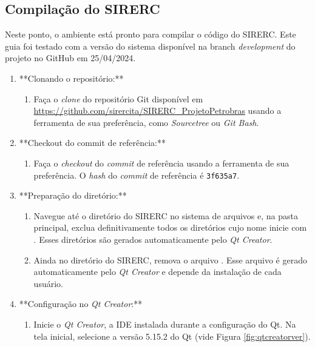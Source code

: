 \documentclass[a4paper,11pt]{article}
\newcommand{\sistema}{\textsf{SIRERC}}
\newcommand{\qtcreator}{\textit{Qt Creator}}
\begin{document}
\subsection{Compilação do \sistema{}}

Neste ponto, o ambiente está pronto para compilar o código do \sistema{}. Este guia foi testado com a versão do sistema disponível na branch \emph{development} do projeto no GitHub em 25/04/2024.

\begin{enumerate}
	\item **Clonando o repositório:**
	\begin{enumerate}
		\item Faça o \emph{clone} do repositório Git disponível em \url{https://github.com/sirercita/SIRERC_ProjetoPetrobras} usando a ferramenta de sua preferência, como \textit{Sourcetree} ou \textit{Git Bash}.
	\end{enumerate}
	
	\item **Checkout do commit de referência:**
	\begin{enumerate}
		\item Faça o \emph{checkout} do \emph{commit} de referência usando a ferramenta de sua preferência. O \emph{hash} do \emph{commit} de referência é \texttt{3f635a7}.
	\end{enumerate}
	
	\item **Preparação do diretório:**
	\begin{enumerate}
		\item Navegue até o diretório do \sistema{} no sistema de arquivos e, na pasta principal, exclua definitivamente todos os diretórios cujo nome inicie com . Esses diretórios são gerados automaticamente pelo \qtcreator{}.
		\item Ainda no diretório do \sistema{}, remova o arquivo . Esse arquivo é gerado automaticamente pelo \qtcreator{} e depende da instalação de cada usuário.
	\end{enumerate}
	
	\item **Configuração no \qtcreator{}:**
	\begin{enumerate}
		\item Inicie o \qtcreator{}, a IDE instalada durante a configuração do Qt. Na tela inicial, selecione a versão 5.15.2 do Qt (vide Figura \ref{fig:qtcreatorver}).
		

\end{enumerate}
\end{enumerate}
\end{document}
